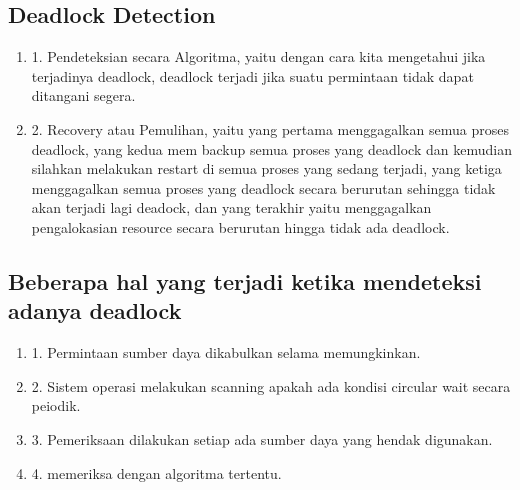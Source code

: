 \subsection {Deadlock Detection}
\begin {enumerate}
\item
1. Pendeteksian secara Algoritma, yaitu dengan cara kita mengetahui jika terjadinya deadlock, deadlock terjadi jika suatu permintaan tidak dapat ditangani segera.
	
\item
2. Recovery atau Pemulihan, yaitu yang pertama menggagalkan semua proses deadlock, yang kedua mem backup semua proses yang deadlock dan kemudian silahkan melakukan restart di semua proses yang sedang terjadi, yang ketiga menggagalkan semua proses yang deadlock secara berurutan sehingga tidak akan terjadi lagi deadock, dan yang terakhir yaitu menggagalkan pengalokasian resource secara berurutan hingga tidak ada deadlock.

\end {enumerate}

\subsection {Beberapa hal yang terjadi ketika mendeteksi adanya deadlock}
\begin {enumerate}
\item
1. Permintaan sumber daya dikabulkan selama memungkinkan.
\item
2. Sistem operasi melakukan scanning apakah ada kondisi circular wait secara peiodik.
\item
3. Pemeriksaan dilakukan setiap ada sumber daya yang hendak digunakan.
\item
4. memeriksa dengan algoritma tertentu.
\end {enumerate}

